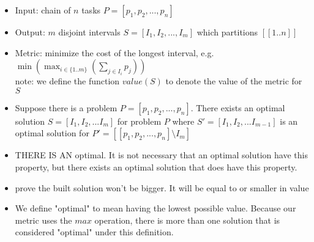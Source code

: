 \documentclass[landscape]{slides}
\begin{document}

\begin{slide} %
	\begin{itemize}
    \item Input: chain of $n$ tasks $P = [p_1, p_2, ..., p_n]$
    \item Output: $m$ disjoint intervals  $S = [I_1, I_2, ..., I_m]$ which
    			partitions $[[1..n]]$
    \item Metric: minimize the cost of the longest interval, e.g.
					$\min(\max_{i\in\{1..m\}}(\sum_{j \in{I_i}} p_j))$
					\\note: we define the function $value (S)$ to denote the value of 
					the metric for $S$
	\end{itemize}
\end{slide}

\begin{slide} %
	\begin{itemize}
	\item Suppose there is a problem $P = [p_1, p_2, ..., p_n]$. There exists an
	optimal solution $S = [I_1, I_2, ... I_m]$ for problem $P$ 
	where $S' = [I_1, I_2, ... I_{m-1}]$ is an optimal solution for 
	$P' = [[p_1, p_2, ..., p_n] \setminus I_m]$
	\item THERE IS AN optimal. It is not necessary that an optimal solution have
	this property, but there exists an optimal solution that does have this
	property.
	\item prove the built solution won't be bigger. It will be equal to or
	smaller in value
	\end{itemize}
\end{slide}

\begin{slide} %
	\begin{itemize}
		\item We define "optimal" to mean having the lowest possible value. Because
		our metric uses the $max$ operation, there is more than one solution that
		is considered "optimal" under this definition.
	\end{itemize}
\end{slide}
\end{document}
